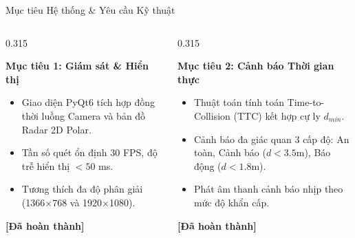 \documentclass[aspectratio=169, 11pt]{beamer}
\begin{document}
\begin{frame}{Mục tiêu Hệ thống \& Yêu cầu Kỹ thuật}
  \vspace{0.10cm}
  \begin{columns}[T, onlytextwidth]
    \begin{column}{0.315\textwidth}
      \begin{tcolorbox}[
        enhanced, colback=white, colframe=DarkMain, boxrule=0.9pt, arc=3.2pt,
        top=4pt, bottom=4pt, left=5pt, right=5pt
      ]
        {\fontsize{8.2pt}{9.8pt}\selectfont\bfseries\color{DarkMain} Mục tiêu 1: Giám sát \& Hiển thị}\\[3pt]
        {\fontsize{7.0pt}{8.8pt}\selectfont
        \begin{itemize}
          \item Giao diện PyQt6 tích hợp đồng thời luồng Camera và bản đồ Radar 2D Polar.
          \item Tần số quét ổn định 30 FPS, độ trễ hiển thị $< 50$ ms.
          \item Tương thích đa độ phân giải (1366$\times$768 và 1920$\times$1080).
        \end{itemize}}
        \vspace{2pt}
        \hfill{\fontsize{7.0pt}{8.5pt}\selectfont\textbf{\color{DarkMain}[Đã hoàn thành]}}
      \end{tcolorbox}
    \end{column}

    \begin{column}{0.315\textwidth}
      \begin{tcolorbox}[
        enhanced, colback=white, colframe=DarkMain, boxrule=0.9pt, arc=3.2pt,
        top=4pt, bottom=4pt, left=5pt, right=5pt
      ]
        {\fontsize{8.2pt}{9.8pt}\selectfont\bfseries\color{DarkMain} Mục tiêu 2: Cảnh báo Thời gian thực}\\[3pt]
        {\fontsize{7.0pt}{8.8pt}\selectfont
        \begin{itemize}
          \item Thuật toán tính toán Time-to-Collision (TTC) kết hợp cự ly $d_{min}$.
          \item Cảnh báo đa giác quan 3 cấp độ: An toàn, Cảnh báo ($d < 3.5$m), Báo động ($d < 1.8$m).
          \item Phát âm thanh cảnh báo nhịp theo mức độ khẩn cấp.
        \end{itemize}}
        \vspace{2pt}
        \hfill{\fontsize{7.0pt}{8.5pt}\selectfont\textbf{\color{DarkMain}[Đã hoàn thành]}}
      \end{tcolorbox}
    \end{column}


\end{columns}
\end{frame}
\end{document}
